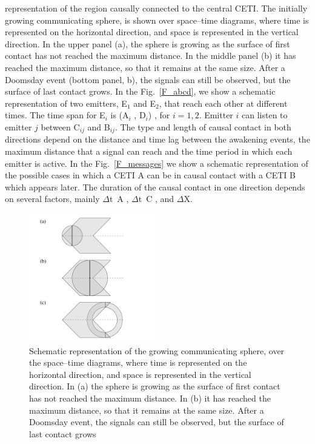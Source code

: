 \documentclass[crop]{CSLB}%
\begin{document}
representation of the region causally connected to the central CETI.
%
The initially growing communicating sphere, is shown over
space--time diagrams, where time is represented on the horizontal
direction, and space is represented in the vertical direction.
%
In the upper panel (a), the sphere is growing as the surface of first
contact has not reached the maximum distance.
%
In the middle panel (b) it has reached the maximum distance, so that
it remains at the same size.
%
After a Doomsday event (bottom panel, b), the signals can still be
observed, but the surface of last contact grows.
%
In the Fig.~\ref{F_abcd}, we show a schematic representation of two
emitters, E$_1$ and E$_2$, that reach each other at different times.
%
The time span for E$_i$ is (A$_i$ , D$_i$) , for $i = {1, 2}$.
%
Emitter $i$ can listen to emitter $j$ between C$_{ij}$ and B$_{ij}$.
%
The type and length of causal contact in both directions depend on the
distance and time lag between the awakening events, the maximum
distance that a signal can reach and the time period in which each
emitter is active.
%
In the Fig.~\ref{F_messages} we show a schematic representation of the
possible cases in which a CETI A can be in causal contact with a CETI
B which appears later.
%
The duration of the causal contact in one direction depends on several
factors, mainly $\Delta$t~A , $\Delta$t~C , and $\Delta$X.


\begin{figure}
   \centering
   \includegraphics[width=0.5\textwidth]{growingsphere.pdf}
   \caption{Schematic representation of the growing communicating
   sphere, over the space--time diagrams, where time is represented on
   the horizontal direction, and space is represented in the vertical
   direction.  In (a) the sphere is
   growing as the surface of first contact has not reached the maximum
   distance.  In (b) it has reached the maximum distance, so that it
   remains at the same size.  After a Doomsday event, the signals can
   still be observed, but the surface of last contact grows }
   \label{F_growing_sphere}
\end{figure}
\end{document}
